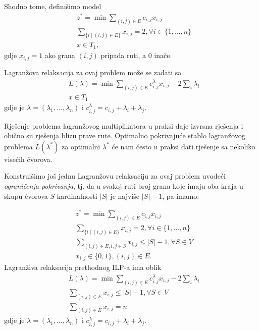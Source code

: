 \documentclass[a4paper, utf8, 11pt, colorlinks]{article}
\begin{document}
Shodno tome, definišimo model
\begin{align*}
    &z^* = \min \sum_{(i,j)\in E} c_{i,j} x_{i,j}\\
    & \sum_{ \{ i \mid (i,j) \in E \} } x_{i,j} = 2, \forall i \in \{1,\ldots, n \} \\
    & x \in T_1,
\end{align*}
gdje $x_{i,j} = 1$ ako grana $(i,j)$ pripada ruti, a 0 inače.

Lagranžova relaksacija za ovaj problem može se zadati sa 
\begin{align*}
     &L(\lambda) = \min \sum_{(i,j)\in E} c^\lambda_{i,j} x_{i,j} - 2 \sum_{i} \lambda_i \\
     & x \in T_1
\end{align*}
gdje je $\lambda=(\lambda_1, \ldots, \lambda_n)$ i $c^\lambda_{i,j} = c_{i,j} + \lambda_i + \lambda_j$. 

Rješenje problema lagranžovog multiplikatora u praksi daje izvrsna rješenja i obično su rješenja blizu prave rute. Optimalno pokrivajuće stablo lagranžovog problema $L(\lambda^*)$ za optimalni $\lambda^*$ će nam često u praksi dati rješenje sa  nekoliko visećih čvorova. 

Konstruišimo još jednu Lagranžovu relaksaciju za ovaj problem uvodeći \emph{ograničenja pokrivanja}, tj. da u svakoj ruti broj grana koje imaju oba kraja u skupu čvorova $S$ kardinalnosti $|S|$ je najviše $|S|-1$, pa imamo: 

\begin{align*}
     & z^* = \min \sum_{(i,j)\in E} c_{i,j} x_{i,j} \\
     & \sum_{ \{ i \mid (i,j) \in E \} } x_{i,j} = 2, \forall i \in \{1,\ldots, n \} \\
     & \sum_{(i,j) \in E, i,j \in S} x_{i,j} \leq |S|-1, \forall S \in V \\
     & x_{i,j} \in \{0, 1 \}, (i,j)\in E.
\end{align*}
Lagranživa relaksacija prethodnog ILP-a ima oblik 
\begin{align*}
 &L(\lambda) = \min \sum_{(i,j)\in E} c^\lambda_{i,j} x_{i,j} - 2 \sum_{i} \lambda_i \\
 & \sum_{(i,j) \in E} x_{i,j} \leq |S|-1, \forall S \in V \\
 & \sum_{(i,j) \in E} x_{i,j} = n
\end{align*}
gdje je $\lambda=(\lambda_1, \ldots, \lambda_n)$ i $c^\lambda_{i,j} = c_{i,j} + \lambda_i + \lambda_j$. 

\end{document}
